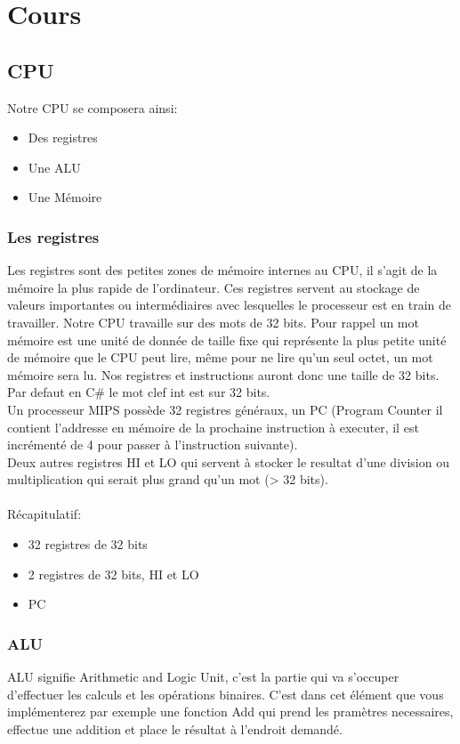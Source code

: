 \section{Cours}

\subsection{CPU}

Notre CPU se composera ainsi:
\begin{itemize}
\item Des registres
\item Une ALU
\item Une Mémoire
\end{itemize}

\subsubsection{Les registres}
Les registres sont des petites zones de mémoire internes au CPU, il s'agit de la mémoire la plus rapide de l'ordinateur. Ces registres servent au stockage de valeurs importantes ou intermédiaires avec lesquelles le processeur est en train de travailler. Notre CPU travaille sur des mots de 32 bits. Pour rappel un mot mémoire est une unité de donnée de taille fixe qui représente la plus petite unité de mémoire que le CPU peut lire, même pour ne lire qu'un seul octet, un mot mémoire sera lu. Nos registres et instructions auront donc une taille de 32 bits. Par defaut en C\# le mot clef int est sur 32 bits.\\
Un processeur MIPS possède 32 registres généraux, un PC (Program Counter il contient l'addresse en mémoire de la prochaine instruction à executer,  il est incrémenté de 4 pour passer à l'instruction suivante).\\
Deux autres registres HI et LO qui servent à stocker le resultat d'une division ou multiplication qui serait plus grand qu'un mot (> 32 bits).
\\\\
Récapitulatif:
\begin{itemize}
\item 32 registres de 32 bits
\item 2 registres de 32 bits, HI et LO
\item PC
\end{itemize}

\subsubsection{ALU}
ALU signifie Arithmetic and Logic Unit, c'est la partie qui va s'occuper d'effectuer les calculs et les  opérations binaires. C'est dans cet élément que vous implémenterez par exemple une fonction Add qui prend les pramètres necessaires, effectue une addition et place le résultat à l'endroit demandé.

